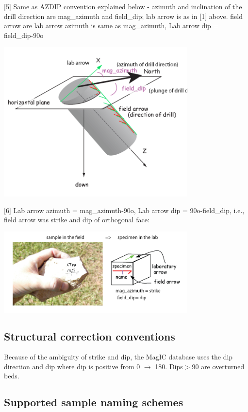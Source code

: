 \documentclass[11pt]{book}
\begin{document}
{{        [5] Same as AZDIP convention explained below - azimuth and inclination of the drill direction are mag_azimuth and field_dip; lab arrow is as in [1] above. field arrow are lab arrow azimuth is same as mag_azimuth, Lab arrow dip = field_dip-90o
        
               \includegraphics[width=10cm]{EPSfiles/azdip.png}
               
 
 [6] Lab arrow azimuth = mag_azimuth-90o, Lab arrow dip = 90o-field_dip, i.e., field arrow was strike and dip of orthogonal face:
 
                \includegraphics[width=10cm]{EPSfiles/hand.png}           
        
        \subsection{Structural correction conventions}
        

Because of the ambiguity of strike and dip, the MagIC database uses the dip direction and dip where dip is positive from 0 $\rightarrow$ 180. Dips$ > $90 are overturned beds. 


        
\subsection{Supported sample naming schemes}

}}
\end{document}
